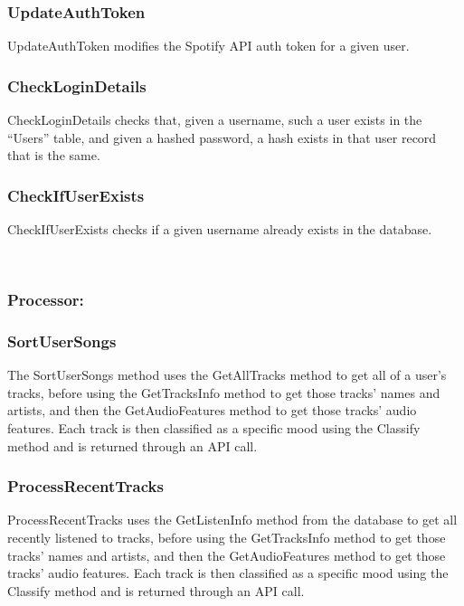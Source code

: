 \documentclass[10pt, notitlepage]{report}
\begin{document}
\subsubsection{UpdateAuthToken}
UpdateAuthToken modifies the Spotify API auth token for a given user.

\subsubsection{CheckLoginDetails}
CheckLoginDetails checks that, given a username, such a user exists in the “Users” table, and given a hashed password, a hash exists in that user record that is the same.

\subsubsection{CheckIfUserExists}
CheckIfUserExists checks if a given username already exists in the database.



\leavevmode \\

\subsubsection{Processor:}

\hrulefill

\subsubsection{SortUserSongs}
The SortUserSongs method uses the GetAllTracks method to get all of a user’s tracks, before using the GetTracksInfo method to get those tracks’ names and artists, and then the GetAudioFeatures method to get those tracks’ audio features. Each track is then classified as a specific mood using the Classify method and is returned through an API call.

\subsubsection{ProcessRecentTracks}
ProcessRecentTracks uses the GetListenInfo method from the database to get all recently listened to tracks, before using the GetTracksInfo method to get those tracks’ names and artists, and then the GetAudioFeatures method to get those tracks’ audio features. Each track is then classified as a specific mood using the Classify method and is returned through an API call.
\end{document}
